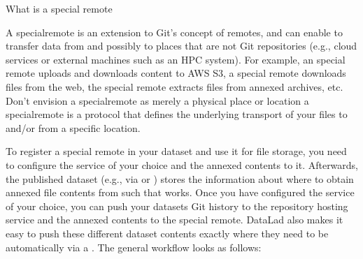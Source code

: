 \ignorespaces \begin{findoutmore}[label={fom-special-remote}, before title={\thetcbcounter\ }, float, floatplacement=tb, check odd page=true]{What is a special remote}
\label{\detokenize{basics/101-138-sharethirdparty:fom-special-remote}}

\sphinxAtStartPar
A special\sphinxhyphen{}remote is an extension to Git’s concept of remotes, and can
enable {\hyperref[\detokenize{glossary:term-git-annex}]{}} to transfer data from and possibly to places that are not Git
repositories (e.g., cloud services or external machines such as an HPC
system). For example, an  special remote uploads and downloads content
to AWS S3, a  special remote downloads files from the web, the  special remote
extracts files from annexed archives, etc. Don’t envision a special\sphinxhyphen{}remote
as merely a physical place or location \textendash{} a special\sphinxhyphen{}remote is a protocol that
defines the underlying transport of your files to and/or from a specific location.


\end{findoutmore}

\sphinxAtStartPar
To register a special remote in your dataset and use it for file storage, you need to configure the service of your choice and  the annexed contents to it. Afterwards, the published dataset (e.g., via {\hyperref[\detokenize{glossary:term-GitHub}]{}} or {\hyperref[\detokenize{glossary:term-GitLab}]{}}) stores the information about where to obtain annexed file contents from such that
 works.
Once you have configured the service of your choice, you can push your datasets Git history to the repository hosting service and the annexed contents to the special remote. DataLad also makes it easy to push these different dataset contents exactly where they need to be automatically via a {\hyperref[\detokenize{glossary:term-publication-dependency}]{}}.
The general workflow looks as follows:


